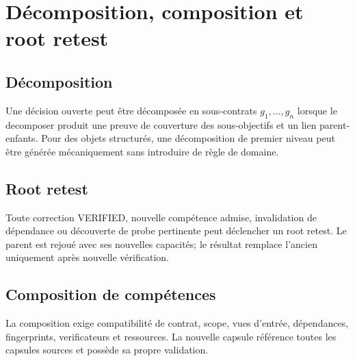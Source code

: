\documentclass[11pt,a4paper]{report}
\begin{document}
\chapter{Décomposition, composition et root retest}
\section{Décomposition}
Une décision ouverte peut être décomposée en sous-contrats $g_1,...,g_n$ lorsque le decomposer produit une preuve de couverture des sous-objectifs et un lien parent-enfants. Pour des objets structurés, une décomposition de premier niveau peut être générée mécaniquement sans introduire de règle de domaine.

\section{Root retest}
Toute correction VERIFIED, nouvelle compétence admise, invalidation de dépendance ou découverte de probe pertinente peut déclencher un root retest. Le parent est rejoué avec ses nouvelles capacités; le résultat remplace l'ancien uniquement après nouvelle vérification.

\section{Composition de compétences}
La composition exige compatibilité de contrat, scope, vues d'entrée, dépendances, fingerprints, verificateurs et ressources. La nouvelle capsule référence toutes les capsules sources et possède sa propre validation.
\end{document}
